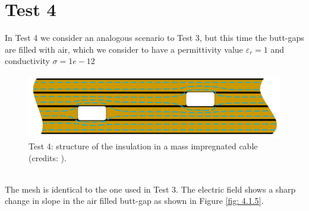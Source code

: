 \documentclass{Configuration_Files/PoliMi3i_thesis}
\let\epsilon\varepsilon
\begin{document}
\section{Test 4}
In Test 4 we consider an analogous scenario to Test 3, but this time the butt-gaps are filled with air, which we consider to have a permittivity value $\epsilon_r=1$ and conductivity $\sigma=1e-12$
\begin{figure}[h!]
    \centering
   \includegraphics[scale=0.5]{Images/4.butt.png}
    \caption {Test 4: structure of the insulation in a mass impregnated cable (credits: \cite{butt}).}
    \label{fig: 4.1}
\end{figure}
\\The mesh is identical to the one used in Test 3. The electric field shows a sharp change in slope in the air filled butt-gap as shown in Figure \ref{fig: 4.1.5}.
\end{document}
